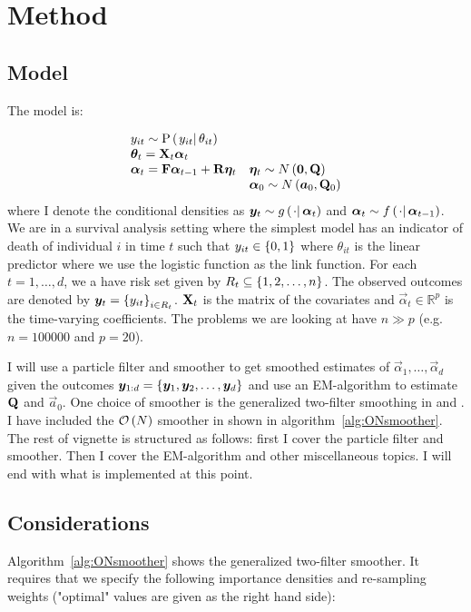 \section{Method}
\subsection*{Model}
The model is:

\begin{equation}
\begin{array}{ll}
 	y_{it} \sim \propC{y_{it}}{\theta_{it}} & \\
%
 	\vec{\theta}_{t} = \mat{X}_t\vec{\alpha}_t \\
% 
 	\vec{\alpha}_t = \mat{F}\vec{\alpha}_{t - 1} + \mat{R}\vec{\eta}_t &
 		\vec{\eta}_t \sim N\Lparen{\vec{0}, \mat{Q}} \\
%
	&	\vec{\alpha}_0 \sim N\Lparen{\vec{a}_0, \mat{Q}_0}
 \end{array}
\end{equation}%
%
where I  denote the conditional densities as $\vec{y}_t \sim \optorC{g}{\cdot}{\vec{\alpha}_t}$ and $\vec{\alpha}_t \sim \optorC{f}{\cdot}{\vec{\alpha}_{t-1}}$. We are in a survival analysis setting where the simplest model has an indicator of death of individual $i$ in time $t$ such that $y_{it} \in \left\{ 0, 1\right\}$ where $\theta_{it}$ is the linear predictor where we use the logistic function as the link function. For each $t=1,\dots,d$, we a have risk set given by $R_t \subseteq \left\{ 1,2,\dots,n\right\}$. The observed outcomes are denoted by $\bm{y}_t = \left\{ y_{it}\right\}_{i \in R_t}$. $\mathbf{X}_t$ is the matrix of the covariates and $\vec{\alpha}_t \in \mathbb{R}^p$ is the time-varying coefficients. The problems we are looking at have $n \gg p$ (e.g. $n = 100000$ and $p = 20$). 

I will use a particle filter and smoother to get smoothed estimates of $\vec{\alpha}_1, \dots, \vec{\alpha}_d$ given the outcomes $\bm{y}_{1:d} = \left\{ \bm{y}_1,\bm{y}_2,\dots, \bm{y}_d\right\}$ and use an EM-algorithm to estimate $\mathbf{Q}$ and $\vec{a}_0$. One choice of smoother is the generalized two-filter smoothing in \cite{fearnhead10} and \cite{briers10}. I have included the $\mathcal{O}\left( N\right)$ smoother in \cite{fearnhead10} shown in algorithm~\ref{alg:ONsmoother}. The rest of vignette is structured as follows: first I cover the particle filter and smoother. Then I cover the EM-algorithm and other miscellaneous topics. I will end with what is implemented at this point.

\subsection*{Considerations}
Algorithm~\ref{alg:ONsmoother} shows the generalized two-filter smoother. It requires that we specify the following importance densities and re-sampling weights ("optimal" values are given as the right hand side):

